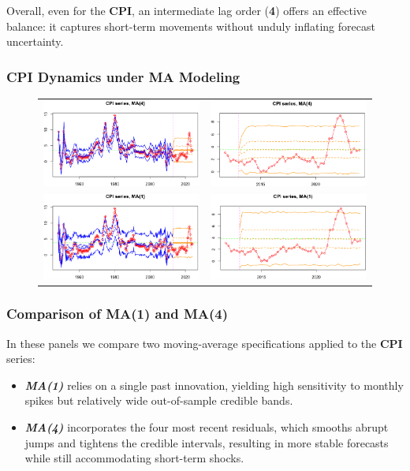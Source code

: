 \documentclass{Configuration_Files/PoliMi3i_thesis}
\begin{document}
Overall, even for the \textbf{CPI}, an intermediate lag order (\textbf{4}) offers an effective balance: it captures short-term movements without unduly inflating forecast uncertainty.

\subsubsection{CPI Dynamics under MA Modeling}

\begin{figure}[H]
  \centering
  \begin{tabular}{@{}cc@{}}
    \includegraphics[angle=90,width=0.33\linewidth]{CPI_FMA(4).png} &
    \includegraphics[angle=90,width=0.33\linewidth]{CPI_ZMA(4).png} \\
    \includegraphics[angle=90,width=0.33\linewidth]{CPI_FMA(1).png} &
    \includegraphics[angle=90,width=0.335\linewidth]{CPI_ZMA(1).png}
  \end{tabular}
\end{figure}
\newpage
\subsubsection*{Comparison of MA(1) and MA(4)}

In these panels we compare two moving-average specifications applied to the \textbf{CPI} series:
\begin{itemize}
  \item \textbf{\textit{MA(1)}} relies on a single past innovation, yielding high sensitivity to monthly spikes but relatively wide out-of-sample credible bands.
  \item \textbf{\textit{MA(4)}} incorporates the four most recent residuals, which smooths abrupt jumps and tightens the credible intervals, resulting in more stable forecasts while still accommodating short-term shocks.
\end{itemize}
\end{document}
